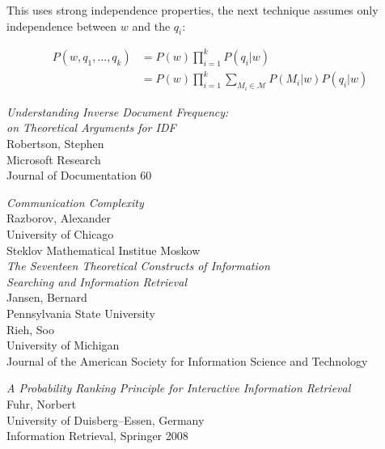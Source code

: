 \documentclass{article}
\newcommand{\bibtitle}[1]{{\it #1}}
\newcommand{\M}{\mathcal{M}}
\begin{document}
\begin{itemize}
    This uses strong independence properties, the next technique assumes only independence between $w$ and the $q_i$:

    \begin{align*}
        P(w,q_1,\dots,q_k) & = P(w)\prod_{i=1}^k P(q_i|w)  \\
              & = P(w)\prod_{i=1}^k \sum_{M_i \in \M} P(M_i|w)P(q_i|w)
    \end{align*}



\end{itemize}

%


\begin{thebibliography}{99}

        \bibtitle{Understanding Inverse Document Frequency:\\
                    on Theoretical Arguments for IDF} \\
        Robertson, Stephen \\
        Microsoft Research \\
        Journal of Documentation 60

        \bibtitle{Communication Complexity} \\
        Razborov, Alexander \\
        University of Chicago \\
        Steklov Mathematical Institue Moskow \\

        \bibtitle{The Seventeen Theoretical Constructs of Information\\
            Searching and Information Retrieval} \\
        Jansen, Bernard \\
        Pennsylvania State University \\
        Rieh, Soo \\
        University of Michigan \\
        Journal of the American Society for 
        Information Science and Technology

        \bibtitle{A Probability Ranking Principle for
            Interactive Information Retrieval} \\
        Fuhr, Norbert \\
        University of Duisberg--Essen, Germany \\
        Information Retrieval, Springer 2008


\end{thebibliography}
\end{document}
